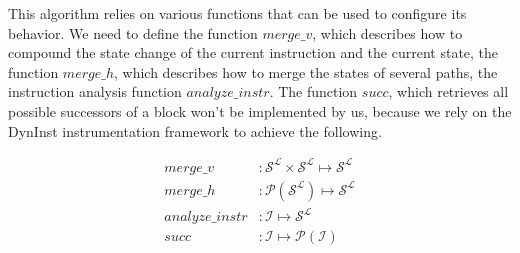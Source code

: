 This algorithm relies on various functions that can be used to configure its behavior. We need to define the function
$merge\_v$, which describes how to compound the state change of the current instruction and the current state, 
the function $merge\_h$, which describes how to merge the states of several paths, the instruction analysis function
$analyze\_instr$. The function $succ$, which retrieves all possible successors of a block won't be implemented by us, 
because we rely on the DynInst instrumentation framework to achieve the following.

\begin{subequations}
\label{eq:livenesscustom}
\begin{align}
merge\_v &: \mathcal{S}^\mathcal{L} \times \mathcal{S}^\mathcal{L} \mapsto \mathcal{S}^\mathcal{L}\\
merge\_h &: \mathcal{P}(\mathcal{S}^\mathcal{L}) \mapsto \mathcal{S}^\mathcal{L}\\
analyze\_instr &: \mathcal {I} \mapsto \mathcal{S}^\mathcal{L} \\
succ &: \mathcal{I} \mapsto \mathcal{P}(\mathcal{I})
\end{align}
\end{subequations}


